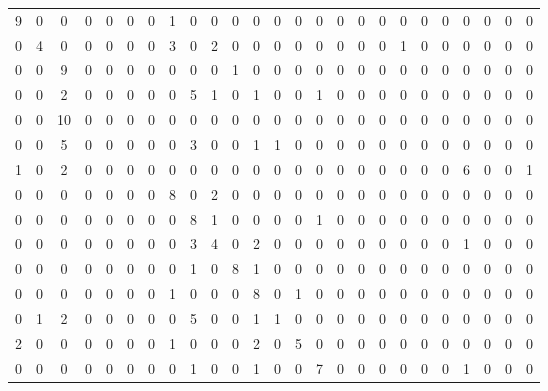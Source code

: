 \documentclass[10pt,twocolumn,letterpaper]{article}
\begin{document}
\begin{table}
\begin{subtable}{.5\textwidth}
\begin{tabular}{|c|c|c|c|c|c|c|c|c|c|c|c|c|c|c|c|c|c|c|c|c|c|c|c|c|}
\hline
9 & 0 & 0 & 0 & 0 & 0 & 0 & 1 & 0 & 0 & 0 & 0 & 0 & 0 & 0 & 0 & 0 & 0 & 0 & 0 & 0 & 0 & 0 & 0 & 0 \\
0 & 4 & 0 & 0 & 0 & 0 & 0 & 3 & 0 & 2 & 0 & 0 & 0 & 0 & 0 & 0 & 0 & 0 & 1 & 0 & 0 & 0 & 0 & 0 & 0\\
0 & 0 & 9 & 0 & 0 & 0 & 0 & 0 & 0 & 0 & 1 & 0 & 0 & 0 & 0 & 0 & 0 & 0 & 0 & 0 & 0 & 0 & 0 & 0 & 0\\
0 & 0 & 2 & 0 & 0 & 0 & 0 & 0 & 5 & 1 & 0 & 1 & 0 & 0 & 1 & 0 & 0 & 0 & 0 & 0 & 0 & 0 & 0 & 0 & 0\\
0 & 0 & 10 & 0 & 0 & 0 & 0 & 0 & 0 & 0 & 0 & 0 & 0 & 0 & 0 & 0 & 0 & 0 & 0 & 0 & 0 & 0 & 0 & 0 & 0\\
0 & 0 & 5 & 0 & 0 & 0 & 0 & 0 & 3 & 0 & 0 & 1 & 1 & 0 & 0 & 0 & 0 & 0 & 0 & 0 & 0 & 0 & 0 & 0 & 0\\
1 & 0 & 2 & 0 & 0 & 0 & 0 & 0 & 0 & 0 & 0 & 0 & 0 & 0 & 0 & 0 & 0 & 0 & 0 & 0 & 0 & 6 & 0 & 0 & 1\\
0 & 0 & 0 & 0 & 0 & 0 & 0 & 8 & 0 & 2 & 0 & 0 & 0 & 0 & 0 & 0 & 0 & 0 & 0 & 0 & 0 & 0 & 0 & 0 & 0\\
0 & 0 & 0 & 0 & 0 & 0 & 0 & 0 & 8 & 1 & 0 & 0 & 0 & 0 & 1 & 0 & 0 & 0 & 0 & 0 & 0 & 0 & 0 & 0 & 0\\
0 & 0 & 0 & 0 & 0 & 0 & 0 & 0 & 3 & 4 & 0 & 2 & 0 & 0 & 0 & 0 & 0 & 0 & 0 & 0 & 0 & 1 & 0 & 0 & 0\\
0 & 0 & 0 & 0 & 0 & 0 & 0 & 0 & 1 & 0 & 8 & 1 & 0 & 0 & 0 & 0 & 0 & 0 & 0 & 0 & 0 & 0 & 0 & 0 & 0\\
0 & 0 & 0 & 0 & 0 & 0 & 0 & 1 & 0 & 0 & 0 & 8 & 0 & 1 & 0 & 0 & 0 & 0 & 0 & 0 & 0 & 0 & 0 & 0 & 0\\
0 & 1 & 2 & 0 & 0 & 0 & 0 & 0 & 5 & 0 & 0 & 1 & 1 & 0 & 0 & 0 & 0 & 0 & 0 & 0 & 0 & 0 & 0 & 0 & 0\\
2 & 0 & 0 & 0 & 0 & 0 & 0 & 1 & 0 & 0 & 0 & 2 & 0 & 5 & 0 & 0 & 0 & 0 & 0 & 0 & 0 & 0 & 0 & 0 & 0\\
0 & 0 & 0 & 0 & 0 & 0 & 0 & 0 & 1 & 0 & 0 & 1 & 0 & 0 & 7 & 0 & 0 & 0 & 0 & 0 & 0 & 1 & 0 & 0 & 0\\

\end{tabular}
\end{subtable}
\end{table}
\end{document}
